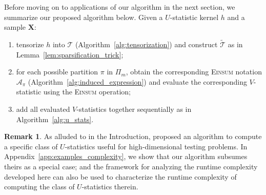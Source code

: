 \documentclass[12pt]{article}
\theoremstyle{plain}
\theoremstyle{definition}
\newtheorem{remark}{Remark}
\def\tilde{\widetilde}
\def\Einsum{\textsc{Einsum}}
\newcommand{\graphset}{\mathcal{G}}
\newcommand{\graphform}[1]{G_{#1}}
\def\calA{\mathcal{A}}
\def\calT{\mathcal{T}}
\begin{document}
\begin{bibunit}[agsm]
Before moving on to applications of our algorithm in the next section, we summarize our proposed algorithm below. Given a $U$-statistic kernel $h$ and a sample $\bm{X}$:
\begin{enumerate}[label = (\arabic*)]
\item tensorize $h$ into $\calT$ (Algorithm~\ref{alg:tensorization}) and construct $\tilde{\calT}$ as in Lemma~\ref{lem:sparsification_trick};

\item for each possible partition $\pi$ in $\Pi_{m}$, obtain the corresponding \Einsum{} notation $\calA_{\pi}$ (Algorithm~\ref{alg:induced_expression}) and evaluate the corresponding $V$-statistic using the \Einsum{} operation;

\item add all evaluated $V$-statistics together sequentially as in Algorithm~\ref{alg:u_stats}.
\end{enumerate}

\begin{remark}
\label{rem:he}
As alluded to in the Introduction, \citet{he2021asymptotically} proposed an algorithm to compute a specific class of $U$-statistics useful for high-dimensional testing problems. In Appendix~\ref{app:examples_complexity}, we show that our algorithm subsumes theirs as a special case; and the framework for analyzing the runtime complexity developed here can also be used to characterize the runtime complexity of computing the class of $U$-statistics therein.
\end{remark}




\end{bibunit}
\end{document}
